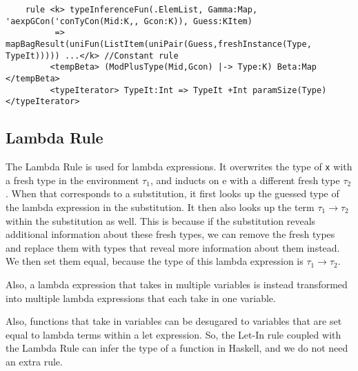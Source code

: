 \begin{lstlisting}
    rule <k> typeInferenceFun(.ElemList, Gamma:Map, 'aexpGCon('conTyCon(Mid:K,, Gcon:K)), Guess:KItem)
          => mapBagResult(uniFun(ListItem(uniPair(Guess,freshInstance(Type, TypeIt))))) ...</k> //Constant rule
         <tempBeta> (ModPlusType(Mid,Gcon) |-> Type:K) Beta:Map </tempBeta>
         <typeIterator> TypeIt:Int => TypeIt +Int paramSize(Type) </typeIterator>
\end{lstlisting}

\subsection{Lambda Rule}

The Lambda Rule is used for lambda expressions. It overwrites the type of \texttt{x} with a fresh type in the environment \texttt{$\tau_1$}, and inducts on e with a different fresh type \texttt{$\tau_2$}. When that corresponds to a substitution, it first looks up the guessed type of the lambda expression in the substitution. It then also looks up the term \texttt{$\tau_1 \rightarrow \tau_2$} within the substitution as well. This is because if the substitution reveals additional information about these fresh types, we can remove the fresh types and replace them with types that reveal more information about them instead. We then set them equal, because the type of this lambda expression is \texttt{$\tau_1 \rightarrow \tau_2$}.

Also, a lambda expression that takes in multiple variables is instead transformed into multiple lambda expressions that each take in one variable.

Also, functions that take in variables can be desugared to variables that are set equal to lambda terms within a let expression. So, the Let-In rule coupled with the Lambda Rule can infer the type of a function in Haskell, and we do not need an extra rule.

\begin{prooftree}
\end{prooftree}

